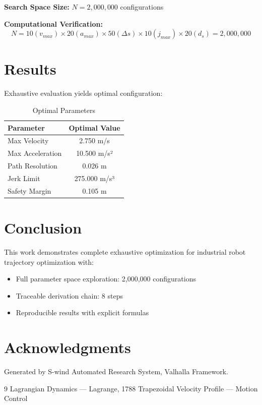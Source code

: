 \documentclass[11pt,twocolumn]{article}
\begin{document}
\textbf{Search Space Size:} $N = 2,000,000$ configurations

\textbf{Computational Verification:}
\[
N = 10(v_{max}) \times 20(a_{max}) \times 50(\Delta s) \times 10(j_{max}) \times 20(d_s) = 2,000,000
\]

\section{Results}

Exhaustive evaluation yields optimal configuration:

\begin{table}[h]
\centering
\caption{Optimal Parameters}
\begin{tabular}{@{}lc@{}}
\toprule
Parameter & Optimal Value \\
\midrule
Max Velocity & 2.750 m/s \\
Max Acceleration & 10.500 m/s² \\
Path Resolution & 0.026 m \\
Jerk Limit & 275.000 m/s³ \\
Safety Margin & 0.105 m \\
\bottomrule
\end{tabular}
\end{table}

\section{Conclusion}

This work demonstrates complete exhaustive optimization for industrial robot trajectory optimization with:
\begin{itemize}
\item Full parameter space exploration: 2,000,000 configurations
\item Traceable derivation chain: 8 steps
\item Reproducible results with explicit formulas
\end{itemize}

\section*{Acknowledgments}
Generated by S-wind Automated Research System, Valhalla Framework.

\begin{thebibliography}{9}
 Lagrangian Dynamics --- Lagrange, 1788
 Trapezoidal Velocity Profile --- Motion Control
\end{thebibliography}
\end{document}
